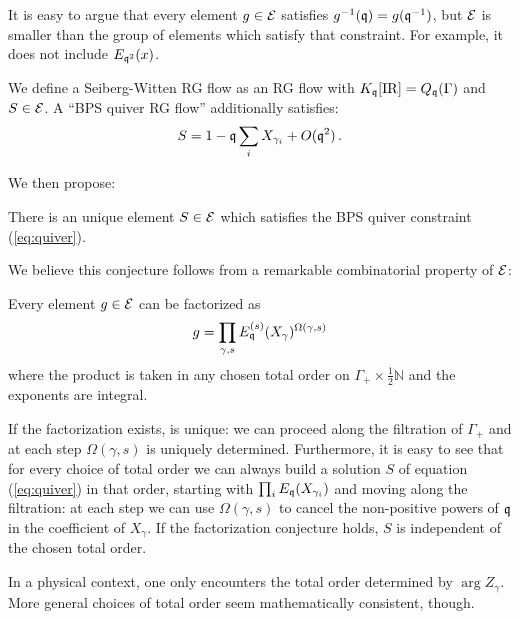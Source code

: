 \documentclass[12pt]{amsart}
\begin{document}
\begin{remark} It is easy to argue that every element $g \in \mathcal{E}$ satisfies $g^{-1}(\mathfrak{q}) = g(\mathfrak{q}^{-1})$, but $\mathcal{E}$ is smaller than the group 
of elements which satisfy that constraint. For example, it does not include $E_{\mathfrak{q}^2}(x)$. \end{remark}

\begin{definition}
\label{def:sw}
We define a Seiberg-Witten RG flow as an RG flow with $K_{\mathfrak{q}}[\mathrm{IR}] = Q_{\mathfrak{q}}(\Gamma)$ and $S \in \mathcal{E}$. A ``BPS quiver RG flow'' additionally satisfies:
\begin{equation} \label{eq:quiver}
	S = 1 - \mathfrak{q} \sum_i X_{\gamma_i} + O(\mathfrak{q}^2) \, .
\end{equation}
\end{definition}
We then propose:
\begin{conjecture}[Uniqueness of $S$]\label{conj:S-unique}
	There is an unique element $S \in \mathcal{E}$ which satisfies the BPS quiver constraint (\ref{eq:quiver}).
\end{conjecture}
We believe this conjecture follows from a remarkable combinatorial property of $\mathcal{E}$:
\begin{conjecture}\label{conj:pbw}
	Every element $g\in \mathcal{E}$ can be factorized as 
	\begin{equation}
		g = \prod_{\gamma,s} E^{(s)}_{\mathfrak{q}}(X_\gamma)^{\Omega(\gamma,s)}
	\end{equation}
	where the product is taken in any chosen total order on 
	$\Gamma_+ \times \tfrac12\mathbb{N}$ and the exponents are integral.
\end{conjecture}
\begin{remark} If the factorization exists, is unique: we can proceed along the filtration of $\Gamma_+$ and at each step 
$\Omega(\gamma,s)$ is uniquely determined. Furthermore, it is easy to see that for every choice of total order 
we can always build a solution $S$ of equation (\ref{eq:quiver}) in that order, starting with $\prod_i E_{\mathfrak{q}}(X_{\gamma_i})$ and 
moving along the filtration: at each step we can use $\Omega(\gamma,s)$ to cancel the non-positive powers of $\mathfrak{q}$ in the coefficient of $X_\gamma$. If the factorization conjecture holds, $S$ is independent of the chosen total order. \end{remark}

\begin{remark} In a physical context, one only encounters the total order determined by $\arg Z_\gamma$. More general choices of total order seem mathematically consistent, though. \end{remark}
\end{document}
